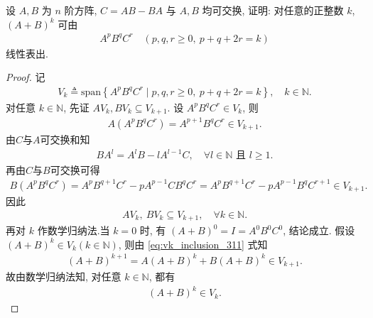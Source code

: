 \documentclass[../../main.tex]{subfiles}%
\begin{document}
\begin{example}
设 $A,B$ 为 $n$ 阶方阵, $C = AB - BA$ 与 $A,B$ 均可交换, 证明: 对任意的正整数 $k$, $(A+B)^k$ 可由
\begin{align*}
A^p B^q C^r \quad (p,q,r \geqslant 0,\ p+q+2r = k)
\end{align*}
线性表出.
\end{example}
\begin{proof}
记
\begin{align*}
V_k \triangleq \mathrm{span}\left\{ A^pB^qC^r \mid p,q,r\geqslant 0,\ p+q+2r=k \right\}, \quad k\in \mathbb{N}.
\end{align*}
对任意 $k\in \mathbb{N}$, 先证 $AV_k, BV_k \subseteq V_{k+1}$. 设 $A^pB^qC^r\in V_k$, 则
\begin{align*}
A\left( A^pB^qC^r \right) = A^{p+1}B^qC^r \in V_{k+1}.
\end{align*}
由$C$与$A$可交换和知
\begin{align*}
BA^l = A^lB - lA^{l-1}C, \quad \forall l\in \mathbb{N} \text{ 且 } l\geqslant 1.
\end{align*}
再由$C$与$B$可交换可得
\begin{align*}
B\left( A^pB^qC^r \right) = A^pB^{q+1}C^r - pA^{p-1}CB^qC^r = A^pB^{q+1}C^r - pA^{p-1}B^qC^{r+1} \in V_{k+1}.
\end{align*}
因此
\begin{align}
AV_k,\ BV_k \subseteq V_{k+1}, \quad \forall k\in \mathbb{N}.
\label{eq:vk_inclusion_311}
\end{align}
再对 \(k\) 作数学归纳法.当 $k=0$ 时, 有 $(A+B)^0 = I = A^0B^0C^0$, 结论成立.
假设 $(A+B)^k \in V_k \left( k\in \mathbb{N} \right)$, 则由 \eqref{eq:vk_inclusion_311} 式知
\begin{align*}
(A+B)^{k+1} = A(A+B)^k + B(A+B)^k \in V_{k+1}.
\end{align*}
故由数学归纳法知, 对任意 $k\in \mathbb{N}$, 都有
\begin{align*}
(A+B)^k \in V_k.
\end{align*}
\end{proof}
\end{document}
